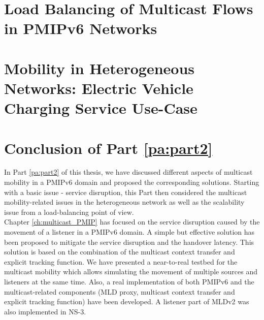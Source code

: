 \documentclass[a4paper,10pt,twoside]{ThesisStyle}
\begin{document}
\chapter{Load Balancing of Multicast Flows in PMIPv6 Networks} \label{ch:LB} 


\chapter{Mobility in Heterogeneous Networks: Electric Vehicle Charging Service Use-Case} 
\label{ch:EVCS}



\chapter*{Conclusion of Part \ref{pa:part2}}
In Part \ref{pa:part2} of this thesis, we have discussed different aspects of multicast mobility in a PMIPv6 domain and proposed the corresponding solutions. Starting with a basic issue - service disruption, this Part then considered the multicast mobility-related issues in the heterogeneous network as well as the scalability issue from a load-balancing point of view.\\

Chapter \ref{ch:multicast_PMIP} has focused on the service disruption caused by the movement of a listener in a PMIPv6 domain. A simple but effective solution has been proposed to mitigate the service disruption and the handover latency. This solution is based on the combination of the multicast context transfer and explicit tracking function. We have presented a near-to-real testbed for the multicast mobility which allows simulating the movement of multiple sources and listeners at the same time. Also, a real implementation of both PMIPv6 and the multicast-related components (MLD proxy, multicast context transfer and explicit tracking function) have been developed. A listener part of MLDv2 was also implemented in NS-3.  \\
\end{document}
